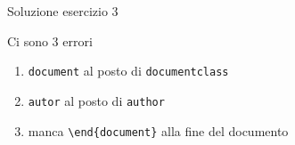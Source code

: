 \begin{frame}{Soluzione esercizio 3}

Ci sono 3 errori
\begin{enumerate}
	\item \texttt{document} al posto di \texttt{documentclass}
	\item \texttt{autor} al posto di \texttt{author}
	\item manca \texttt{\textbackslash{}end\{document\}} alla fine del documento
\end{enumerate}

\end{frame}